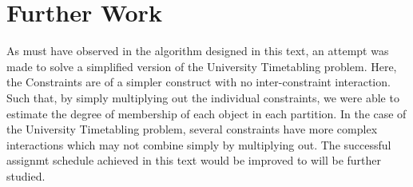 \documentclass[a4paper,openany]{book}
\begin{document}
		\section{Further Work}
			As must have observed in the algorithm designed in this text, an attempt was made to solve a simplified version of the University Timetabling problem. Here, the Constraints are of a simpler construct with no inter-constraint interaction. Such that, by simply multiplying out the individual constraints, we were able to estimate the degree of membership of each object in each partition. In the case of the University Timetabling problem, several constraints have more complex interactions which may not combine simply by multiplying out. The successful assignmt schedule achieved in this text would be improved to  will be further studied.
	\newpage
	\renewcommand\bibname{References}
	
	
\end{document}
